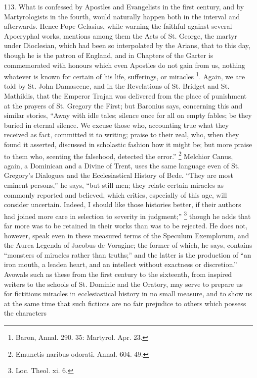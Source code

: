 113.
What is confessed by Apostles and Evangelists in the first century,
and by Martyrologists in the fourth, would naturally happen both in
the interval and afterwards. Hence Pope Gelasius, while warning the
faithful against several Apocryphal works, mentions among them the
Acts of St. George, the martyr under Dioclesian, which had been so
interpolated by the Arians, that to this day, though he is the patron
of England, and in Chapters of the Garter is commemorated with honours
which even Apostles do not gain from us, nothing whatever is known for
certain of his life, sufferings, or miracles \footnote{Baron, Annal. 290. 35: Martyrol. Apr. 23.}. Again, we are told by St. John Damascene, and in the
Revelations of St. Bridget and St. Mathildis, that the Emperor Trajan was delivered from the place of punishment at the prayers of
St. Gregory the First; but Baronius says, concerning this and similar
stories, ``Away with idle tales; silence once for all on empty fables;
be they buried in eternal silence. We excuse those who, accounting
true what they received as fact, committed it to writing; praise to
their zeal, who, when they found it asserted, discussed in scholastic
fashion how it might be; but more praise to them who, scenting the
falsehood, detected the error.'' \footnote{Emunctis naribus odorati. Annal. 604. 49.} Melchior Canus, again, a Dominican and a Divine of Trent, uses
the same language even of St. Gregory's Dialogues and the
Ecclesiastical History of Bede. ``They are most eminent persons,'' he
says, ``but still men; they relate certain miracles as commonly
reported and believed, which critics, especially of this age, will
consider uncertain. Indeed, I should like those histories better, if
their authors had joined more care in selection to severity in
judgment;'' \footnote{Loc. Theol. xi. 6.} though he adds
that far more was to be retained in their works than was to be
rejected. He does not, however, speak even in these measured terms of
the Speculum Exemplorum, and the Aurea Legenda of Jacobus de Voragine;
the former of which, he says, contains ``monsters of miracles rather
than truths;'' and the latter is the production of ``an iron mouth, a
leaden heart, and an intellect without exactness or discretion.''
Avowals such as these from the first century to the sixteenth, from
inspired writers to the schools of St. Dominic and the Oratory, may
serve to prepare us for fictitious miracles in ecclesiastical history
in no small measure, and to show us at the same time that such
fictions are no fair prejudice to others which possess the characters
